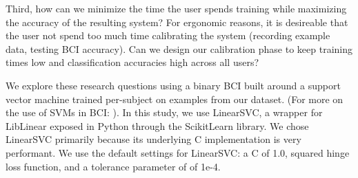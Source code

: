 Third, how can we minimize the time the user spends training while maximizing the accuracy of the resulting system? For ergonomic reasons, it is desireable that the user not spend too much time calibrating the system (recording example data, testing BCI accuracy). Can we design our calibration phase to keep training times low and classification accuracies high across all users?

We explore these research questions using a binary BCI built around a support vector machine trained per-subject on examples from our dataset. (For more on the use of SVMs in BCI: \cite{garrett_comparison_2003,grierson_better_2011}). In this study, we use LinearSVC, \cite{fan_liblinear:_2008} a wrapper for LibLinear exposed in Python through the ScikitLearn library. \cite{pedregosa_scikit-learn:_2011} We chose LinearSVC primarily because its underlying C implementation is very performant. We use the default settings for LinearSVC: a C of 1.0, squared hinge loss function, and a tolerance parameter of of 1e-4. 


